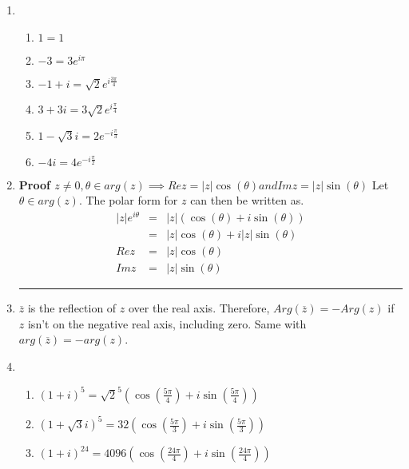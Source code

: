 \documentclass{article}%
\newcommand\abs[1]{\left|#1\right|}
\newenvironment{proof}[1][]{\begin{samepage}\textbf{Proof #1} }{\rule{0.5em}{0.5em} \end{samepage}}
\begin{document}
\begin{enumerate}
\begin{enumerate}[label*=\arabic*.]
        \item %
        \begin{enumerate}[label=\alph*]
            \item %
                $1=1$
            \item %
                $-3=3e^{i\pi}$
            \item %
                $-1+i=\sqrt{2}e^{i\frac{3\pi}{4}}$
            \item %
                $3+3i=3\sqrt{2}e^{i\frac{\pi}{4}}$
            \item %
                $1-\sqrt{3}i=2e^{-i\frac{\pi}{3}}$
            \item %
                $-4i=4e^{-i\frac{\pi}{2}}$
        \end{enumerate}
        \item %
        \begin{proof}[$z \neq 0, \theta \in arg(z) \implies Re z=\abs{z}\cos(\theta) and Im z = \abs{z}\sin(\theta)$]
            Let $\theta \in arg(z)$.
            The polar form for $z$ can then be written as.
            \begin{eqnarray*}
                \abs{z} e^{i \theta} &=& \abs{z} (\cos(\theta) + i \sin(\theta)) \\
                                     &=& \abs{z} \cos(\theta) + i\abs{z}\sin(\theta) \\
                                Re z &=& \abs{z} \cos(\theta) \\
                                Im z &=& \abs{z} \sin(\theta)
            \end{eqnarray*}
        \end{proof}
        \item %
            $\overline{z}$ is the reflection of $z$ over the real axis.  Therefore, $Arg(\overline{z})=-Arg(z)$ if $z$ isn't on the negative real axis, including zero. Same with $arg(\overline{z})=-arg(z)$.
        \setcounter{enumii}{22}
        \item %
        \begin{enumerate}[label=\alph*]
            \item %
                $(1+i)^5=\sqrt{2}^5(\cos(\frac{5 \pi}{4}) + i \sin(\frac{5 \pi}{4}))$
            \item %
                $(1+\sqrt{3}i)^5=32(\cos(\frac{5 \pi}{3}) + i \sin(\frac{5 \pi}{3}))$
            \item %
                $(1+i)^{24}=4096(\cos(\frac{24 \pi}{4}) + i \sin(\frac{24 \pi}{4}))$

\end{enumerate}
\end{enumerate}
\end{enumerate}
\end{document}
